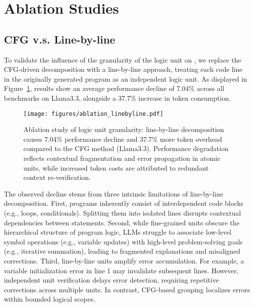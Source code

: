 \section{Ablation Studies}
\subsection{CFG v.s. Line-by-line}
To validate the influence of the granularity of the logic unit on \tool, we replace the CFG-driven decomposition with a line-by-line approach, treating each code line in the originally generated program as an independent logic unit. 
As displayed in Figure~\ref{fig:abla:linebyline}, results show an average performance decline of 7.04\% across all benchmarks on Llama3.3, alongside a 37.7\% increase in token consumption.

\begin{figure}[htb]
    \centering
    \vspace{-0.1in}
        {\texttt{[image: figures/ablation\_linebyline.pdf]}}
        \vspace{-0.1in}
    \caption{Ablation study of logic unit granularity: line-by-line decomposition causes 7.04\% performance decline and 37.7\% more token overhead compared to the CFG method (Llama3.3). Performance degradation reflects contextual fragmentation and error propagation in atomic units, while increased token costs are attributed to redundant context re-verification.}
    \vspace{-0.15in}
    \label{fig:abla:linebyline}
\end{figure}

The observed decline stems from three intrinsic limitations of line-by-line decomposition.
First, programs inherently consist of interdependent code blocks (e.g., loops, conditionals). Splitting them into isolated lines disrupts contextual dependencies between statements.
Second, while fine-grained units obscure the hierarchical structure of program logic, LLMs struggle to associate low-level symbol operations (e.g., variable updates) with high-level problem-solving goals (e.g., iterative summation), leading to fragmented explanations and misaligned corrections.
Third, line-by-line units amplify error accumulation. For example, a variable initialization error in line 1 may invalidate subsequent lines. However, independent unit verification delays error detection, requiring repetitive corrections across multiple units. In contrast, CFG-based grouping localizes errors within bounded logical scopes.

